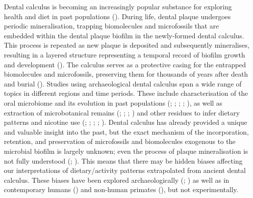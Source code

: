 \documentclass[
  b5paper,
]{book}
\begin{document}
Dental calculus is becoming an increasingly popular substance for
exploring health and diet in past populations
(). During life,
dental plaque undergoes periodic mineralisation, trapping biomolecules
and microfossils that are embedded within the dental plaque biofilm in
the newly-formed dental calculus. This process is repeated as new plaque
is deposited and subsequently mineralises, resulting in a layered
structure representing a temporal record of biofilm growth and
development (). The calculus serves as a protective casing for the entrapped
biomolecules and microfossils, preserving them for thousands of years
after death and burial (). Studies using archaeological dental calculus span
a wide range of topics in different regions and time periods. These
include characterisation of the oral microbiome and its evolution in
past populations (; ; ; ; ),
as well as extraction of microbotanical remains
(;
;
;
) and other residues to infer dietary patterns and nicotine use
(;
;
;
;
). Dental calculus has already provided a unique and valuable
insight into the past, but the exact mechanism of the incorporation,
retention, and preservation of microfossils and biomolecules exogenous
to the microbial biofilm is largely unknown; even the process of plaque
mineralisation is not fully understood
(;
). This
means that there may be hidden biases affecting our interpretations of
dietary/activity patterns extrapolated from ancient dental calculus.
These biases have been explored archaeologically
(; ) as well
as in contemporary humans
() and
non-human primates (), but not experimentally.
\end{document}
